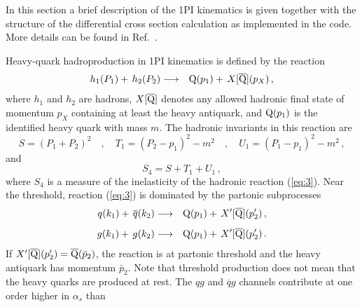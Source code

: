 \documentclass[11pt]{article}
\begin{document}
In this section a brief description of the 1PI kinematics is given together with 
the structure of the differential cross section calculation as implemented in the code.
More details can be found in Ref.~\cite{Guzzi:2014wia}.

Heavy-quark hadroproduction in 1PI kinematics is defined by the reaction
\begin{eqnarray}
\label{eq:3}
h_1(P_1) +\, h_2(P_2) &\longrightarrow& {\rm{Q}}(p_1) +\,
X[{\overline{\rm{Q}}}](p_X)\, , 
\end{eqnarray}
where $h_1$ and $h_2$ are hadrons, $X[\overline{\rm{Q}}]$ denotes any
allowed hadronic final state of momentum $p_X$ containing at least the heavy antiquark,
and ${\rm{Q}}(p_1)$ is the identified heavy quark with mass $m$. The
hadronic invariants in this reaction are
\begin{equation}
  \label{eq:5}
S = (P_1+P_2)^2 \quad,\quad T_1 = (P_2-p_1)^2-m^2 \quad,\quad U_1 =
(P_1-p_1)^2-m^2\,, 
\end{equation}
and
\begin{equation}
  \label{eq:6}
S_4 = S+T_1+U_1\,  ,  
\end{equation}
where $S_4$ is a measure of the inelasticity of the hadronic reaction 
(\ref{eq:3}).  Near the threshold, reaction (\ref{eq:3}) is dominated by
the partonic subprocesses
\begin{eqnarray}
  \label{eq:7}
q(k_1) +\, {\overline{q}}(k_2) &\longrightarrow& {\rm{Q}}(p_1) +\,
X'[{\overline{\rm{Q}}}](p_2')\, ,
\\[1ex]
\label{eq:8}  
g(k_1) +\, g(k_2) &\longrightarrow& {\rm{Q}}(p_1) +\,
X'[{\overline{\rm{Q}}}](p_2')\, . 
\end{eqnarray}
If $X'[{\overline{\rm{Q}}}](p_2')={\overline{\rm{Q}}}(\bar{p}_2)$, the reaction
is at partonic threshold and the heavy antiquark has momentum
$\bar{p}_2$.  Note that threshold production does not
mean that the heavy quarks are produced at rest.  The $qg$ and
$\overline{q}g$ channels contribute at one order higher in $\alpha_s$ than 
\end{document}
